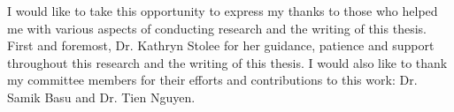 
I would like to take this opportunity to express my thanks to those
who helped me with various aspects of conducting research and the writing
of this thesis.
First and foremost, Dr. Kathryn Stolee for her guidance, patience and support
throughout this research and the writing of this thesis.
I would also like to thank my committee members for their efforts
and contributions to this work: Dr. Samik Basu and
Dr. Tien Nguyen.
